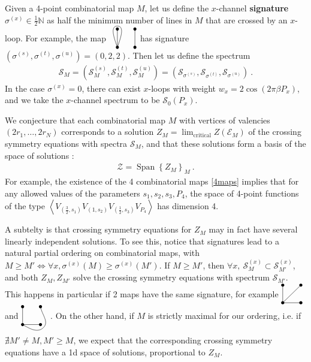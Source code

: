\documentclass[12pt, a4paper]{article}
\newcommand{\myindex}[1]{\textbf{\boldmath #1}}
\newcommand{\vertices}{
\coordinate (base) at (0, 1);
\draw (0, 0) node[fill, circle, minimum size = 1.3mm, inner sep = 0]{};
  \draw (3, 0) node[fill, circle, minimum size = 1.3mm, inner sep = 0]{};
  \draw (0, 3) node[fill, circle, minimum size = 1.3mm, inner sep = 0]{};
  \draw (3, 3) node[fill, circle, minimum size = 1.3mm, inner sep = 0]{};
}
\begin{document}
Given a 4-point combinatorial map $M$, let us define the $x$-channel \myindex{signature} $\sigma^{(x)}\in\frac12\mathbb{N}$ as half the minimum number of lines in $M$ that are crossed by an $x$-loop. For example, the map 
$
\begin{tikzpicture}[baseline=(base), scale = .25]
 \vertices
  \draw (0, 0) -- (0, 3);
  \draw (3, 0) -- (3, 3);
  \draw (0, 0) to [out = 70, in = 0] (0, 3.5) to [out = 180, in = 110] (0, 0);
 \end{tikzpicture}
 $
has signature $(\sigma^{(s)},\sigma^{(t)},\sigma^{(u)})=(0,2,2)$. Then let us define the spectrum
\begin{align}
\mathcal{S}_M = (\mathcal{S}^{(s)}_M, \mathcal{S}^{(t)}_M, \mathcal{S}^{(u)}_M)= (\mathcal{S}_{\sigma^{(s)}},\mathcal{S}_{\sigma^{(t)}},\mathcal{S}_{\sigma^{(u)}})\ .
\end{align}
In the case $\sigma^{(x)}=0$, there can exist $x$-loops with weight $w_x=2\cos(2\pi\beta P_x)$, and we take the $x$-channel spectrum to be $\mathcal{S}_0(P_x)$. 

We conjecture that each combinatorial map $M$ with vertices of valencies $(2r_1,\dots, 2r_N)$ corresponds to a solution $Z_M = \lim_\text{critical} Z(\mathcal{E}_M)$ of the crossing symmetry equations with spectra $\mathcal{S}_M$, and that these solutions form a basis of the space of solutions \cite{gjnrs23}:
\begin{align}
 \mathcal{Z} = \operatorname{Span}\left\{ Z_M\right\}_{M}\  .
\end{align}
For example, the existence of the 4 combinatorial maps
\eqref{4maps} implies that for any allowed values of the parameters $s_1,s_2,s_3,P_4$, the space of 4-point functions of the type $\left<V_{(\frac32,s_1)}V_{(1,s_2)}V_{(\frac12,s_3)}V_{P_4}\right>$ has dimension 4. 

A subtelty is that crossing symmetry equations for $Z_M$ may in fact have several linearly independent solutions. To see this, notice that signatures lead to a natural partial ordering on combinatorial maps, with $M\geq M' \iff \forall x, \sigma^{(x)}(M)\geq \sigma^{(x)}(M')$. If $M\geq M'$, then $\forall x, \ \mathcal{S}_M^{(x)} \subset \mathcal{S}_{M'}^{(x)}$, and both $Z_M,Z_{M'}$ solve the crossing symmetry equations with spectrum $\mathcal{S}_{M'}$. This happens in particular if 2 maps have the same signature, for example 
$
\begin{tikzpicture}[baseline=(base), scale = .25]
 \vertices
  \draw (0, 0) -- (0, 3);
  \draw (0, 0) -- (3, 3);
  \draw (0, 0) -- (3, 0);
 \end{tikzpicture}
$ and $
 \begin{tikzpicture}[baseline=(base), scale = .25]
 \vertices
  \draw (0, 0) -- (3, 0);
  \draw (0, 0) -- (0, 3);
  \draw (0, 0) to [out = -30, in = -135] (3.5, -.5) to [out = 45, in = -80] (3, 3);
  \end{tikzpicture}
$. On the other hand, if $M$ is strictly maximal for our ordering, i.e. if $\nexists M'\neq M, M'\geq M$, we expect that the corresponding crossing symmetry equations have a 1d space of solutions, proportional to $Z_M$.
\end{document}
